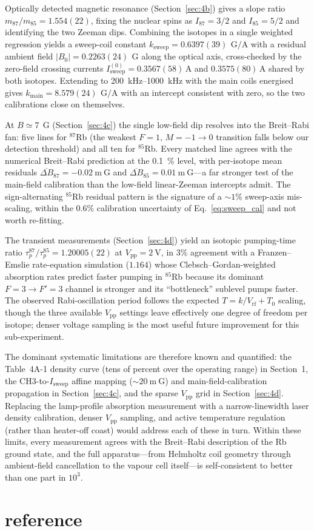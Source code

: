\documentclass[12pt,a4paper]{article}
\newcommand{\gauss}{\ \text{G}}
\theoremstyle{mystyle}
\begin{document}
Optically detected magnetic resonance (Section~\ref{sec:4b}) gives a
slope ratio $m_{87}/m_{85} = 1.554(22)$, fixing the nuclear spins as
$I_{87} = 3/2$ and $I_{85} = 5/2$ and identifying the two Zeeman dips.
Combining the isotopes in a single weighted regression yields a
sweep-coil constant
$k_{\mathrm{sweep}} = 0.6397(39)\,\si{\gauss\per\ampere}$ with a
residual ambient field
$|B_0| = 0.2263(24)\,\si{\gauss}$ along the optical axis,
cross-checked by the zero-field crossing currents
$I_{\mathrm{sweep}}^{(0)} = 0.3567(58)\,\si{\ampere}$ and $0.3575(80)\,\si{\ampere}$
shared by both isotopes. Extending to \SIrange{200}{1000}{\kilo\hertz} with the main
coils energised gives
$k_{\mathrm{main}} = 8.579(24)\,\si{\gauss\per\ampere}$ with an
intercept consistent with zero, so the two calibrations close on
themselves.

At $B \simeq \SI{7}{\gauss}$ (Section~\ref{sec:4c}) the single low-field
dip resolves into the Breit--Rabi fan: five lines for $^{87}$Rb (the
weakest $F=1,\,M{=}{-}1{\to}0$ transition falls below our detection
threshold) and all ten for $^{85}$Rb. Every matched line agrees with the
numerical Breit--Rabi prediction at the \SI{0.1}{\%} level, with
per-isotope mean residuals
$\overline{\Delta B}_{87} = \SI{-0.02}{\milli\gauss}$ and
$\overline{\Delta B}_{85} = \SI{+0.01}{\milli\gauss}$---a far stronger
test of the main-field calibration than the low-field linear-Zeeman
intercepts admit. The sign-alternating $^{85}$Rb residual pattern is
the signature of a ${\sim}1\%$ sweep-axis mis-scaling, within the
$0.6\%$ calibration uncertainty of Eq.~\ref{eq:sweep_cal} and not worth
re-fitting.

The transient measurements (Section~\ref{sec:4d}) yield an isotopic
pumping-time ratio $\tau_p^{87}/\tau_p^{85} = 1.20005(22)$ at
$V_{\mathrm{pp}} = \SI{2}{\volt}$, in $3\%$
agreement with a Franzen--Emslie rate-equation simulation ($1.164$)
whose Clebsch--Gordan-weighted absorption rates predict faster pumping
in $^{85}$Rb because its dominant $F{=}3\!\to\!F'{=}3$ channel is
stronger and its ``bottleneck'' sublevel pumps faster. The observed
Rabi-oscillation period follows the expected
$T = k/V_{\mathrm{rf}} + T_0$ scaling, though the three available
$V_{\mathrm{pp}}$ settings leave effectively one degree of freedom per
isotope; denser voltage sampling is the most useful future improvement
for this sub-experiment.

The dominant systematic limitations are therefore known and quantified:
the Table~4A-1 density curve (tens of percent over the operating range)
in Section~1, the CH3-to-$I_{\mathrm{sweep}}$ affine mapping
(${\sim}\SI{20}{\milli\gauss}$) and main-field-calibration propagation
in Section~\ref{sec:4c}, and the sparse $V_{\mathrm{pp}}$ grid in
Section~\ref{sec:4d}. Replacing the lamp-profile absorption measurement
with a narrow-linewidth laser density calibration, denser
$V_{\mathrm{pp}}$ sampling, and active temperature regulation (rather
than heater-off coast) would address each of these in turn. Within
these limits, every measurement agrees with the Breit--Rabi description
of the Rb ground state, and the full apparatus---from Helmholtz coil
geometry through ambient-field cancellation to the vapour cell
itself---is self-consistent to better than one part in $10^3$.

\section{reference}
\nocite{*}


\end{document}
